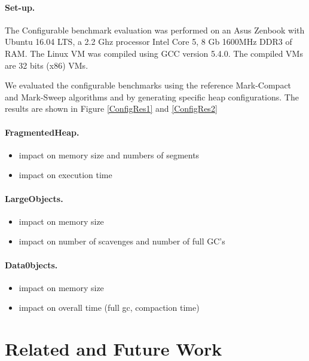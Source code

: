 \documentclass[10pt, sigplan]{acmart}
\begin{document}
\paragraph{Set-up.}The Configurable benchmark evaluation was performed on an Asus Zenbook with Ubuntu 16.04 LTS, a 2.2 Ghz processor Intel Core 5, 8 Gb 1600MHz DDR3 of RAM. The Linux VM was compiled using GCC version 5.4.0. The compiled VMs are 32 bits (x86) VMs.


We evaluated the configurable benchmarks using the reference Mark-Compact and Mark-Sweep algorithms and by generating specific heap configurations. 
The results are shown in Figure \ref{ConfigRes1} and \ref{ConfigRes2}

\paragraph{FragmentedHeap.} 
\begin{itemize}
\item impact on memory size and numbers of segments
\item impact on execution time 
\end{itemize}
\paragraph{LargeObjects.}
\begin{itemize}
\item impact on memory size 
\item impact on number of scavenges and number of full GC's
\end{itemize}
\paragraph{Data0bjects.}
\begin{itemize}
\item impact on memory size
\item impact on overall time (full gc, compaction time)
\end{itemize}

\section{Related and Future Work}
\end{document}
